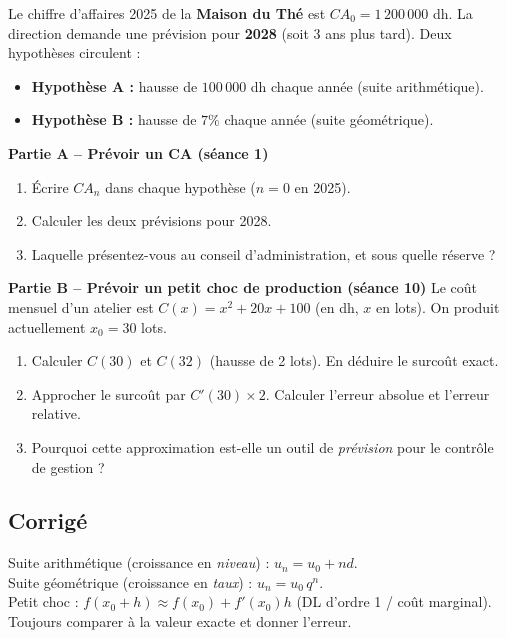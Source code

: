 \documentclass[12pt,a4paper]{article}
\begin{document}
\begin{exobox}
Le chiffre d'affaires 2025 de la \textbf{Maison du Thé} est $CA_0=1\,200\,000$ dh. La direction demande une prévision pour \textbf{2028} (soit 3 ans plus tard). Deux hypothèses circulent :
\begin{itemize}[leftmargin=1.2cm]
  \item \textbf{Hypothèse A :} hausse de $100\,000$ dh chaque année (suite arithmétique).
  \item \textbf{Hypothèse B :} hausse de $7\%$ chaque année (suite géométrique).
\end{itemize}

\textbf{Partie A -- Prévoir un CA (séance 1)}
\begin{enumerate}[label=\alph*)]
  \item Écrire $CA_n$ dans chaque hypothèse ($n=0$ en 2025).
  \item Calculer les deux prévisions pour 2028.
  \item Laquelle présentez-vous au conseil d'administration, et sous quelle réserve ?
\end{enumerate}

\textbf{Partie B -- Prévoir un petit choc de production (séance 10)}
Le coût mensuel d'un atelier est $C(x)=x^2+20x+100$ (en dh, $x$ en lots). On produit actuellement $x_0=30$ lots.
\begin{enumerate}[label=\alph*), resume]
  \item Calculer $C(30)$ et $C(32)$ (hausse de 2 lots). En déduire le surcoût exact.
  \item Approcher le surcoût par $C'(30)\times 2$. Calculer l'erreur absolue et l'erreur relative.
  \item Pourquoi cette approximation est-elle un outil de \emph{prévision} pour le contrôle de gestion ?
\end{enumerate}
\end{exobox}

\subsection{Corrigé}

\begin{methodebox}[Prévisions]
Suite arithmétique (croissance en \emph{niveau}) : $u_n=u_0+nd$.\\
Suite géométrique (croissance en \emph{taux}) : $u_n=u_0\,q^n$.\\
Petit choc : $f(x_0+h)\approx f(x_0)+f'(x_0)h$ (DL d'ordre 1 / coût marginal). Toujours comparer à la valeur exacte et donner l'erreur.
\end{methodebox}
\end{document}
